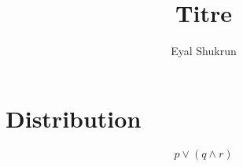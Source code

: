 \documentclass{article}
\title{Titre}
\author{Eyal Shukrun}
\begin{document}
\maketitle

\section{Distribution}
\begin{equation}
  p \lor (q \land r) 
\end{equation}
\end{document}
